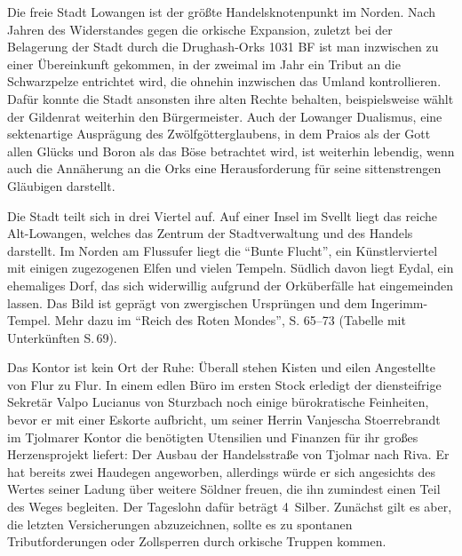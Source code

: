 \spaltenende



\spaltenanfang



Die freie Stadt Lowangen ist der größte Handelsknotenpunkt im Norden. Nach Jahren des Widerstandes gegen die orkische Expansion, zuletzt bei der Belagerung der Stadt durch die Drughash-Orks 1031 BF ist man inzwischen zu einer Übereinkunft gekommen, in der zweimal im Jahr ein Tribut an die Schwarzpelze entrichtet wird, die ohnehin inzwischen das Umland kontrollieren. Dafür konnte die Stadt ansonsten ihre alten Rechte behalten, beispielsweise wählt der Gildenrat weiterhin den Bürgermeister.
Auch der Lowanger Dualismus, eine sektenartige Ausprägung des Zwölfgötterglaubens, in dem Praios als der Gott allen Glücks und Boron als das Böse betrachtet wird, ist weiterhin lebendig, wenn auch die Annäherung an die Orks eine Herausforderung für seine sittenstrengen Gläubigen darstellt.


Die Stadt teilt sich in drei Viertel auf. Auf einer Insel im Svellt liegt das reiche Alt-Lowangen, welches das Zentrum der Stadtverwaltung und des Handels darstellt. Im Norden am Flussufer liegt die \enquote{Bunte Flucht}, ein Künstlerviertel mit einigen zugezogenen Elfen und vielen Tempeln.
Südlich davon liegt Eydal, ein ehemaliges Dorf, das sich widerwillig aufgrund der Orküberfälle hat eingemeinden lassen.
Das Bild ist geprägt von zwergischen Ursprüngen und dem Ingerimm-Tempel.
Mehr dazu im \enquote{Reich des Roten Mondes}, S. 65--73 (Tabelle mit Unterkünften S.\,69).


Das Kontor ist kein Ort der Ruhe: Überall stehen Kisten und eilen Angestellte von Flur zu Flur. In einem edlen Büro im ersten Stock erledigt der diensteifrige Sekretär Valpo Lucianus von Sturzbach noch einige bürokratische Feinheiten, bevor er mit einer Eskorte aufbricht, um seiner Herrin Vanjescha Stoerrebrandt im Tjolmarer Kontor die benötigten Utensilien und Finanzen für ihr großes Herzensprojekt liefert: Der Ausbau der Handelsstraße von Tjolmar nach Riva. Er hat bereits zwei Haudegen angeworben, allerdings würde er sich angesichts des Wertes seiner Ladung über weitere Söldner freuen, die ihn zumindest einen Teil des Weges begleiten. Der Tageslohn dafür beträgt 4~Silber. Zunächst gilt es aber, die letzten Versicherungen abzuzeichnen, sollte es zu spontanen Tributforderungen oder Zollsperren durch orkische Truppen kommen.


